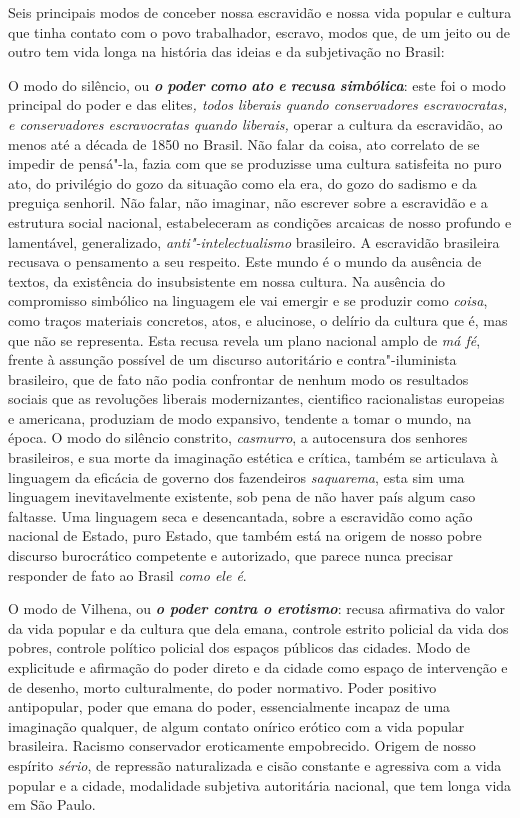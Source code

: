 Seis principais modos de conceber nossa escravidão e nossa vida popular
e cultura que tinha contato com o povo trabalhador, escravo, modos que,
de um jeito ou de outro tem vida longa na história das ideias e da
subjetivação no Brasil:

O modo do silêncio, ou \emph{\textbf{o} \textbf{poder} \textbf{como}
\textbf{ato} \textbf{e} \textbf{recusa} \textbf{simbólica}}: este foi o
modo principal do poder e das elites\emph{, todos liberais quando
conservadores escravocratas, e conservadores escravocratas quando
liberais,} operar a cultura da escravidão, ao menos até a década de 1850
no Brasil. Não falar da coisa, ato correlato de se impedir de pensá"-la,
fazia com que se produzisse uma cultura satisfeita no puro ato, do
privilégio do gozo da situação como ela era, do gozo do sadismo e da
preguiça senhoril. Não falar, não imaginar, não escrever sobre a
escravidão e a estrutura social nacional, estabeleceram as condições
arcaicas de nosso profundo e lamentável, generalizado,
\emph{anti"-intelectualismo} brasileiro. A escravidão brasileira recusava
o pensamento a seu respeito. Este mundo é o mundo da ausência de textos,
da existência do insubsistente em nossa cultura. Na ausência do
compromisso simbólico na linguagem ele vai emergir e se produzir como
\emph{coisa}, como traços materiais concretos, atos, e alucinose, o
delírio da cultura que é, mas que não se representa. Esta recusa revela
um plano nacional amplo de \emph{má fé}, frente à assunção possível de
um discurso autoritário e contra"-iluminista brasileiro, que de fato não
podia confrontar de nenhum modo os resultados sociais que as revoluções
liberais modernizantes, cientifico racionalistas europeias e americana,
produziam de modo expansivo, tendente a tomar o mundo, na época. O modo
do silêncio constrito, \emph{casmurro}, a autocensura dos senhores
brasileiros, e sua morte da imaginação estética e crítica, também se
articulava à linguagem da eficácia de governo dos fazendeiros
\emph{saquarema}, esta sim uma linguagem inevitavelmente existente, sob
pena de não haver país algum caso faltasse. Uma linguagem seca e
desencantada, sobre a escravidão como ação nacional de Estado, puro
Estado, que também está na origem de nosso pobre discurso burocrático
competente e autorizado, que parece nunca precisar responder de fato ao
Brasil \emph{como ele é}.

O modo de Vilhena, ou \emph{\textbf{o poder contra o erotismo}}: recusa
afirmativa do valor da vida popular e da cultura que dela emana,
controle estrito policial da vida dos pobres, controle político policial
dos espaços públicos das cidades. Modo de explicitude e afirmação do
poder direto e da cidade como espaço de intervenção e de desenho, morto
culturalmente, do poder normativo. Poder positivo antipopular, poder que
emana do poder, essencialmente incapaz de uma imaginação qualquer, de
algum contato onírico erótico com a vida popular brasileira. Racismo
conservador eroticamente empobrecido. Origem de nosso espírito
\emph{sério}, de repressão naturalizada e cisão constante e agressiva
com a vida popular e a cidade, modalidade subjetiva autoritária
nacional, que tem longa vida em São Paulo.

